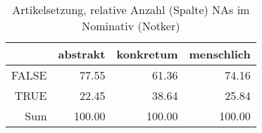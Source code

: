 \begin{table}[ht]
\centering
\begin{tabular}{rrrr}
  \hline
 & abstrakt & konkretum & menschlich \\ 
  \hline
FALSE & 77.55 & 61.36 & 74.16 \\ 
  TRUE & 22.45 & 38.64 & 25.84 \\ 
  Sum & 100.00 & 100.00 & 100.00 \\ 
   \hline
\end{tabular}
\caption{Artikelsetzung, relative Anzahl (Spalte) NAs im Nominativ (Notker)} 
\end{table}
